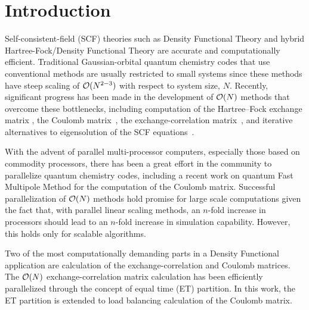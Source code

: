 \commentoutA{\documentclass[prl,aps,twocolumn,twocolumngrid,superbib]{revtex4}}
\begin{document}

\section{Introduction}
\label{sec:intro}
Self-consistent-field (SCF) theories such as Density Functional Theory
and hybrid Hartree-Fock/Density Functional Theory are accurate and
computationally efficient. Traditional Gaussian-orbital quantum
chemistry codes that use conventional methods\cite{ASzabo89} are
usually restricted to small systems since these methods have steep
scaling of ${\cal O}(N^{2-3})$ with respect to system size, $N$.
Recently, significant progress has been made in the development of
${\cal O}(N)$ methods that overcome these bottlenecks, including
computation of the Hartree--Fock exchange matrix
\cite{ESchwegler96,ESchwegler97,ESchwegler98A,ESchwegler99,ESchwegler00,CTymczak04b},
the Coulomb
matrix~\cite{CWhite94B,CWhite96A,MChallacombe96,MChallacombe96B,MStrain96,JPerezjorda97,MChallacombe97,CTymczak04a},
the exchange-correlation
matrix~\cite{CTymczak04a,Jorda95,RStratmann96,CGuerra98,MChallacombe00A},
and iterative alternatives to eigensolution of the SCF
equations~\cite{XLi93,MDaw93,ADaniels97,APalser98,MChallacombe99,ANiklasson02A,ANiklasson03}.

With the advent of parallel multi-processor computers, especially
those based on commodity processors, there has been a great effort in
the community to parallelize quantum chemistry
codes\cite{MSchmidt93,MColvin93,Harrison_94v45,Guerra_95,TFurlani95,Sosa_98v19,vonArnim98,Furlani_00v128,Sosa_00v26,RKendall00,GFletcher00,Baker_02v23,JBaker04}, including a recent work on quantum Fast Multipole Method\cite{CChoi01}
for the computation of the Coulomb matrix.
Successful parallelization of ${\cal O}(N)$ methods hold promise for
large scale computations given the fact that, with parallel linear
scaling methods, an $n$-fold increase in processors should lead to an
$n$-fold increase in simulation capability. However, this holds only
for scalable algorithms.

Two of the most computationally demanding parts in a Density
Functional application are calculation of the exchange-correlation and
Coulomb matrices. The ${\cal O}(N)$ exchange-correlation matrix
calculation has been efficiently parallelized through the concept of
equal time (ET) partition\cite{CGan03}.  In this work, the ET
partition is extended to load balancing calculation of the Coulomb
matrix.
\end{document}

